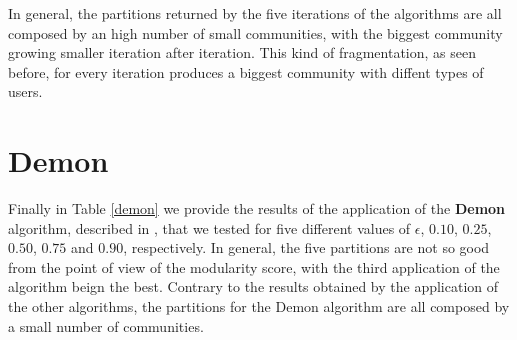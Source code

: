     In general, the partitions returned by the five iterations of the algorithms are all composed by an high number
    of small communities, with the biggest community growing smaller iteration after iteration. This kind of
    fragmentation, as seen before, for every iteration produces a biggest community with diffent types of users.


\section{Demon} %
\label{sec:demon}
    Finally in Table \ref{demon} we provide the results of the application of the \textbf{Demon} algorithm,
    described in \cite{demon}, that we tested for five different values of $\epsilon$, $0.10$, $0.25$, $0.50$,
    $0.75$ and $0.90$, respectively. In general, the five partitions are not so good from the point of view of the
    modularity score, with the third application of the algorithm beign the best.
    Contrary to the results obtained by the application of the other algorithms, the partitions for the Demon
    algorithm are all composed by a small number of communities.

    \begin{table}[H]
        \centering
        \begin{subtable}{\textwidth}
        \end{subtable}
        \caption{Evaluation of the partition obtained by the application of the Demon algorithm.}
        \label{demon}
    \end{table}

